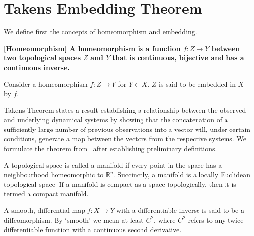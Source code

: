 \section{Takens Embedding Theorem}\label{sect_Takens}

We define first the concepts of homeomorphism and embedding.
\begin{Definition} \rm
  [\bf {Homeomorphism}]\label{Dfn_homeo}\rm
  A homeomorphism is a function $f:Z\rightarrow Y$ between two topological spaces $Z$ and $Y$ that is continuous, bijective and has a continuous inverse. 
\end{Definition}

\begin{Definition}
  [\bf{Embedding}]\label{Dfn_embed}\rm
  Consider a homeomorphism $f:Z\rightarrow Y$ for $Y\subset X$. $Z$ is said to be embedded in $X$ by $f$.
\end{Definition}

Takens Theorem states a result establishing a relationship between the observed and underlying dynamical systems by showing that the concatenation of a sufficiently large number of previous observations into a vector will, under certain conditions, generate a map between the vectors from the respective systems.  We formulate the theorem from~\cite{takens1981detecting} after establishing preliminary definitions.  

\begin{Definition}
  \label{Dfn_compactManif}\rm
  A topological space is called a manifold if every point in the space has a neighbourhood homeomorphic to $\mathbb{R}^n$. Succinctly, a manifold is a locally Euclidean topological space.
  If a manifold is compact as a space topologically, then it is termed a compact manifold.
\end{Definition}

\begin{Definition}
  [\bf{Diffeomorphism}]\label{Dfn_diffeo}\rm
  A smooth, differential map $f:X\to{Y}$ with a differentiable inverse is said to be a diffeomorphism. By `smooth' we mean at least $C^2$, where $C^2$ refers to any twice-differentiable function  with a continuous second derivative.
\end{Definition}

